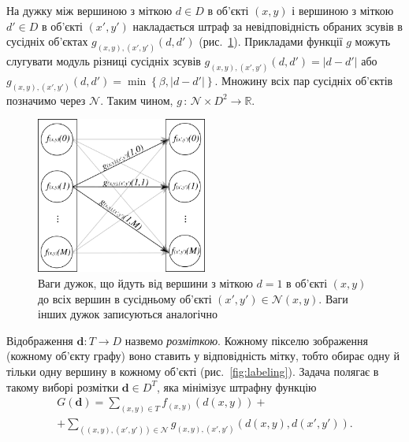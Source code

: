 На дужку між вершиною з міткою $d \in D$ в об'єкті $\left(x, y \right)$
і вершиною з міткою $d' \in D$ в об'єкті $\left(x', y' \right)$
накладається штраф за невідповідність обраних зсувів в сусідніх об'єктах
$g_{\left(x, y \right), \left(x', y' \right)} \left(d, d' \right)$
(рис.~\ref{fig:neighbor:edge:weights}).
Прикладами функції $g$ можуть слугувати модуль різниці сусідніх зсувів
$g_{\left(x, y \right), \left(x', y' \right)} \left(d, d' \right) = \left| d - d' \right|$
або
$g_{\left(x, y \right), \left(x', y' \right)} \left(d, d' \right) =
    \min \left\{ \beta, \left| d - d' \right| \right\}$.
Множину всіх пар сусідніх об'єктів позначимо через $\mathcal{N}$.
Таким чином, $g \, : \, \mathcal{N} \times D^2 \to \mathbb{R}$.

\begin{figure}[h]
  \centering
  \includegraphics[width=0.5\textwidth]{images/neighbor_edge_weights}
  \caption{Ваги дужок, що йдуть від вершини з міткою $d = 1$ в об'єкті
           $\left(x, y \right)$ до всіх вершин в сусідньому об'єкті
           $\left(x', y' \right) \in \mathcal{N}\left(x, y \right)$.
           Ваги інших дужок записуються аналогічно}
  \label{fig:neighbor:edge:weights}
\end{figure}

Відображення $\pmb{d} : T \rightarrow D$ назвемо \textit{розміткою}.
Кожному пікселю зображення (кожному об'єкту графу)
воно ставить у відповідність мітку,
тобто обирає одну й тільки одну вершину в кожному об'єкті
(рис.~\ref{fig:labeling}).
Задача полягає в такому виборі розмітки $\pmb{d} \in D^T$,
яка мінімізує штрафну функцію
\begin{equation} \label{eq:overview:penalty}
\begin{gathered}
    G \left( \pmb{d} \right)
    = \sum \limits_{\left(x, y \right) \in T}
        f_{\left(x, y \right)} \left(d \left(x, y \right) \right) + \\
    + \sum \limits_{\left(\left(x, y \right), \left(x', y'\right) \right) \in \mathcal{N}}
        g_{\left(x, y \right), \left(x', y' \right)} \left(
            d \left( x, y \right), d \left( x', y' \right)
        \right).
\end{gathered}
\end{equation}

